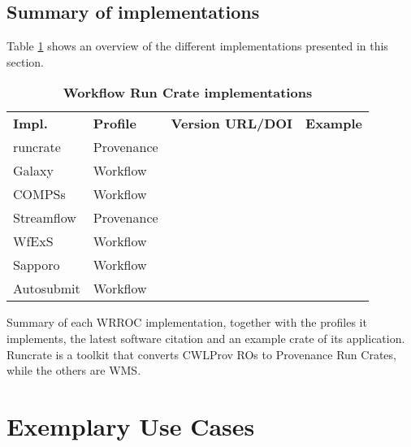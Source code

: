 \documentclass[10pt,letterpaper]{article}
\newlength\savedwidth
\newcommand\thickhline{\noalign{\global\savedwidth\arrayrulewidth\global\arrayrulewidth 2pt}%
\hline
\noalign{\global\arrayrulewidth\savedwidth}}
\begin{document}
\subsection{Summary of implementations}

Table \ref{implementation_summary_table} shows an overview of the different implementations presented in this section.


\begin{table}[!ht]
  \begin{adjustwidth}{-1.4cm}{0in} %
  \centering
  \caption{
  {\bf Workflow Run Crate implementations}}
  \begin{tabular}{l|l|l|l}
  \hline
  {\bf Impl.} & {\bf Profile} & {\bf Version URL/DOI} &
  {\bf Example}\\
  \thickhline
  runcrate & Provenance & \footnotesize \cite{runcrate}  & \footnotesize \cite{run-pathology} \\
  Galaxy & Workflow & \footnotesize \cite{Galaxy 2023} & \footnotesize \cite{De Geest 2023} \\
  COMPSs & Workflow & \footnotesize \cite{Ejarque 2023} & \footnotesize \cite{Poiata 2023} \\
  Streamflow & Provenance & \footnotesize \cite{Colonnelli 2023b} & \footnotesize \cite{Colonnelli 2023} \\
  WfExS & Workflow & \footnotesize \cite{Fernández 2023a} & \footnotesize \cite{Fernández 2023b} \\
  Sapporo & Workflow & \footnotesize \cite{Suetake 2023b} & \footnotesize \cite{Ohta 2023} \\
  Autosubmit & Workflow & \footnotesize \cite{Beltrán 2023} & \footnotesize \cite{Kinoshita 2023} \\
  \end{tabular}
  \begin{flushleft} 
    Summary of each WRROC implementation, together with the profiles it implements, the latest software citation and an example crate of its application. Runcrate is a toolkit that converts CWLProv ROs to Provenance Run Crates, while the others are WMS.
  \end{flushleft}
  \label{implementation_summary_table}
  \end{adjustwidth}
\end{table}
  


\section{Exemplary Use Cases}\label{exemplary-use-cases}
\end{document}
